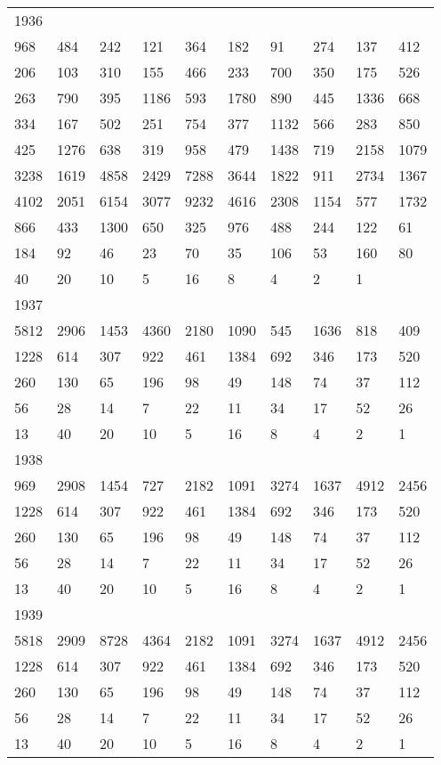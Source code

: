 \begin{longtable}{*{10}{l}}
1936&&&&&&&&&\\
968& 484& 242& 121& 364& 182& 91& 274& 137& 412\\
206& 103& 310& 155& 466& 233& 700& 350& 175& 526\\
263& 790& 395& 1186& 593& 1780& 890& 445& 1336& 668\\
334& 167& 502& 251& 754& 377& 1132& 566& 283& 850\\
425& 1276& 638& 319& 958& 479& 1438& 719& 2158& 1079\\
3238& 1619& 4858& 2429& 7288& 3644& 1822& 911& 2734& 1367\\
4102& 2051& 6154& 3077& 9232& 4616& 2308& 1154& 577& 1732\\
866& 433& 1300& 650& 325& 976& 488& 244& 122& 61\\
184& 92& 46& 23& 70& 35& 106& 53& 160& 80\\
40& 20& 10& 5& 16& 8& 4& 2& 1& \\

1937&&&&&&&&&\\
5812& 2906& 1453& 4360& 2180& 1090& 545& 1636& 818& 409\\
1228& 614& 307& 922& 461& 1384& 692& 346& 173& 520\\
260& 130& 65& 196& 98& 49& 148& 74& 37& 112\\
56& 28& 14& 7& 22& 11& 34& 17& 52& 26\\
13& 40& 20& 10& 5& 16& 8& 4& 2& 1\\

1938&&&&&&&&&\\
969& 2908& 1454& 727& 2182& 1091& 3274& 1637& 4912& 2456\\
1228& 614& 307& 922& 461& 1384& 692& 346& 173& 520\\
260& 130& 65& 196& 98& 49& 148& 74& 37& 112\\
56& 28& 14& 7& 22& 11& 34& 17& 52& 26\\
13& 40& 20& 10& 5& 16& 8& 4& 2& 1\\

1939&&&&&&&&&\\
5818& 2909& 8728& 4364& 2182& 1091& 3274& 1637& 4912& 2456\\
1228& 614& 307& 922& 461& 1384& 692& 346& 173& 520\\
260& 130& 65& 196& 98& 49& 148& 74& 37& 112\\
56& 28& 14& 7& 22& 11& 34& 17& 52& 26\\
13& 40& 20& 10& 5& 16& 8& 4& 2& 1\\


\end{longtable}
